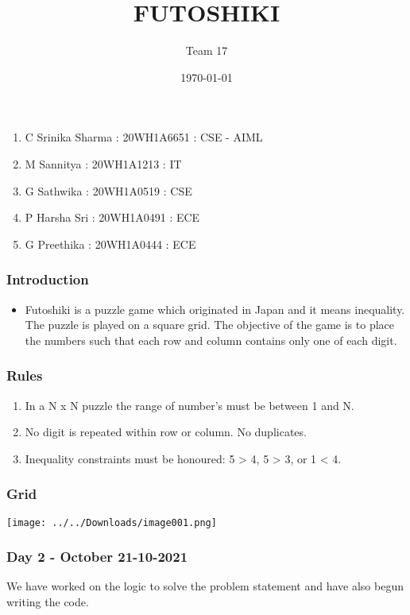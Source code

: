 \documentclass[14pt]{beamer}
\title{FUTOSHIKI}
\subtitle{Team 17}
\date{\today}
\begin{document}
  
  \begin{frame}
        \titlepage
    \end{frame}
  \begin{frame}
	\begin{enumerate}
		\item C Srinika Sharma : 20WH1A6651 : CSE - AIML
		\item M Sannitya : 20WH1A1213 : IT 
		\item G Sathwika : 20WH1A0519 : CSE
		\item P Harsha Sri : 20WH1A0491 : ECE
		\item G Preethika : 20WH1A0444 : ECE
	\end{enumerate}
  \end{frame}


  \begin{frame}
	\frametitle{Introduction}
        
	\begin{itemize}
	    \item Futoshiki is a puzzle game which originated in Japan and it means inequality. The puzzle is played on a square grid. The objective of the game is to place the numbers such that each row and column contains only one of each digit.
	\end{itemize}
	
  \end{frame}
   \begin{frame}
	\frametitle{Rules}

	\begin{enumerate}
	    \item In a N x N puzzle the range of number's must be between 1 and N.  
	    \item No digit is repeated within row or column. No duplicates. 
	    \item Inequality constraints must be honoured: 5 > 4, 5 > 3, or 1 < 4.
	\end{enumerate}
  \end{frame}
 \begin{frame}
	\frametitle{Grid}
        
	\texttt{[image: ../../Downloads/image001.png]}
	
  \end{frame}
   
  \begin{frame}
	\frametitle{Day 2 - October 21-10-2021}
        
	\begin{frame}
	    \item We have worked on the logic to solve the problem statement and have also begun writing the code. 
	\end{frame}
	
  \end{frame}
\end{document}
